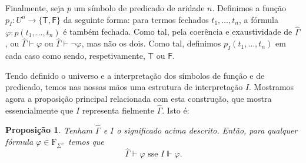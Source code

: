 \documentclass{report}
\newtheorem{prop}{Proposição}
\theoremstyle{definition}
\theoremstyle{remark}
\newcommand{\F}{\mathrm{F}}
\newcommand{\lt}{\mathsf{T}}
\newcommand{\lf}{\mathsf{F}}
\begin{document}
	Finalmente, seja $p$ um símbolo de predicado de aridade $n$. Definimos a função $p_I : U^n \to \{\lt, \lf\}$ da seguinte forma: para termos fechados $t_1, \dots, t_n$, a fórmula $\varphi : p(t_1, \dots, t_n)$ é também fechada. Como tal, pela coerência e exaustividade de $\widehat\Gamma$, ou $\widehat\Gamma \vdash \varphi$ ou $\widehat\Gamma \vdash \neg\varphi$, mas não os dois. Como tal, definimos $p_I(t_1, \dots, t_n)$ em cada caso como sendo, respetivamente, $\lt$ ou $\lf$.
	
	Tendo definido o universo e a interpretação dos símbolos de função e de predicado, temos nas nossas mãos uma estrutura de interpretação $I$. Mostramos agora a proposição principal relacionada com esta construção, que mostra essencialmente que $I$ representa fielmente $\widehat\Gamma$. Isto é:
	
	\begin{prop}\label{prop:gammahatsemantics}
	Tenham $\widehat\Gamma$ e $I$ o significado acima descrito. Então, para qualquer fórmula $\varphi \in \F_{\Sigma^+}$ temos que
	\begin{equation}\label{gammahatsemantics}
	\widehat\Gamma \vdash \varphi \text{ sse } I \Vdash \varphi.
	\end{equation}
	\end{prop}
	
\end{document}
